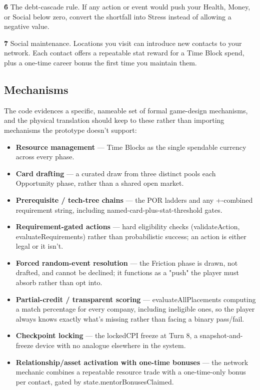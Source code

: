 \textbf{6\.} The debt-cascade rule. If any action or event would push your Health, Money, or Social below zero, convert the shortfall into Stress instead of allowing a negative value.

\textbf{7\.} Social maintenance. Locations you visit can introduce new contacts to your network. Each contact offers a repeatable stat reward for a Time Block spend, plus a one-time career bonus the first time you maintain them.

\subsection{Mechanisms}

The code evidences a specific, nameable set of formal game-design mechanisms, and the physical translation should keep to these rather than importing mechanisms the prototype doesn't support:

\begin{itemize}\item \textbf{Resource management} --- Time Blocks as the single spendable currency across every phase.\item \textbf{Card drafting} --- a curated draw from three distinct pools each Opportunity phase, rather than a shared open market.\item \textbf{Prerequisite / tech-tree chains} --- the POR ladders and any +-combined requirement string, including named-card-plus-stat-threshold gates.\item \textbf{Requirement-gated actions} --- hard eligibility checks (validateAction, evaluateRequirements) rather than probabilistic success; an action is either legal or it isn't.\item \textbf{Forced random-event resolution} --- the Friction phase is drawn, not drafted, and cannot be declined; it functions as a "push" the player must absorb rather than opt into.\item \textbf{Partial-credit / transparent scoring} --- evaluateAllPlacements computing a match percentage for every company, including ineligible ones, so the player always knows exactly what's missing rather than facing a binary pass/fail.\item \textbf{Checkpoint locking} --- the lockedCPI freeze at Turn 8, a snapshot-and-freeze device with no analogue elsewhere in the system.\item \textbf{Relationship/asset activation with one-time bonuses} --- the network mechanic combines a repeatable resource trade with a one-time-only bonus per contact, gated by state.mentorBonusesClaimed.\end{itemize}

